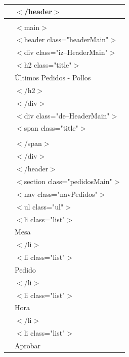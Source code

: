 \documentclass{article} %
\begin{document}
\begin{tabular}{|p{0.6in}|p{4.0in}|}
 &  $\mathrm{<}$/header$\mathrm{>}$ \\ \hline 
 & \newline  \\ \hline 
 &  $\mathrm{<}$main$\mathrm{>}$ \\ \hline 
 &   $\mathrm{<}$header class="headerMain"$\mathrm{>}$ \\ \hline 
 &    $\mathrm{<}$div class="iz--HeaderMain"$\mathrm{>}$ \\ \hline 
 &     $\mathrm{<}$h2 class="title"$\mathrm{>}$ \\ \hline 
 &     \'{U}ltimos Pedidos - Pollos \\ \hline 
 &     $\mathrm{<}$/h2$\mathrm{>}$ \\ \hline 
 &    $\mathrm{<}$/div$\mathrm{>}$ \\ \hline 
 &    $\mathrm{<}$div class="de--HeaderMain"$\mathrm{>}$ \\ \hline 
 &     $\mathrm{<}$span class="title"$\mathrm{>}$ \\ \hline 
 &      \\ \hline 
 &     $\mathrm{<}$/span$\mathrm{>}$ \\ \hline 
 &    $\mathrm{<}$/div$\mathrm{>}$ \\ \hline 
 &   $\mathrm{<}$/header$\mathrm{>}$ \\ \hline 
 &   $\mathrm{<}$section class="pedidosMain"$\mathrm{>}$ \\ \hline 
 &    $\mathrm{<}$nav class="navPedidos"$\mathrm{>}$ \\ \hline 
 &     $\mathrm{<}$ul class="ul"$\mathrm{>}$ \\ \hline 
 &      $\mathrm{<}$li class="list"$\mathrm{>}$ \\ \hline 
 &       Mesa \\ \hline 
 &      $\mathrm{<}$/li$\mathrm{>}$ \\ \hline 
 &      $\mathrm{<}$li class="list"$\mathrm{>}$ \\ \hline 
 &       Pedido \\ \hline 
 &      $\mathrm{<}$/li$\mathrm{>}$ \\ \hline 
 &      $\mathrm{<}$li class="list"$\mathrm{>}$ \\ \hline 
 &       Hora \\ \hline 
 &      $\mathrm{<}$/li$\mathrm{>}$ \\ \hline 
 &      $\mathrm{<}$li class="list"$\mathrm{>}$ \\ \hline 
 &       Aprobar \\ \hline 

\end{tabular}
\end{document}
